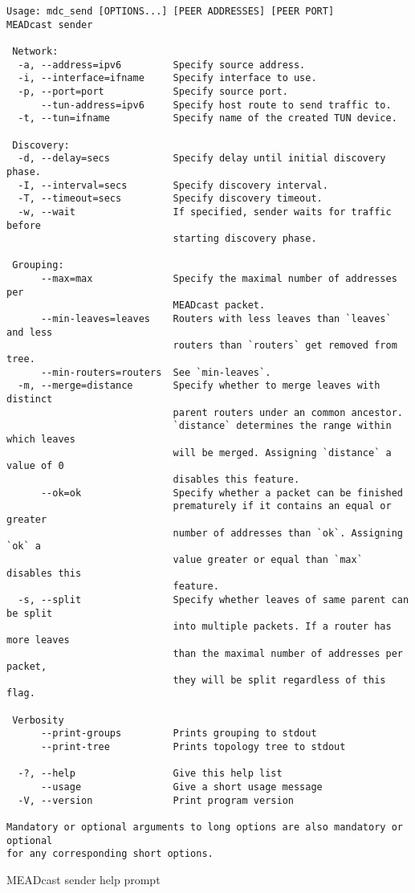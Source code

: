 \begin{listing}
\begin{verbatim}
Usage: mdc_send [OPTIONS...] [PEER ADDRESSES] [PEER PORT]
MEADcast sender

 Network:
  -a, --address=ipv6         Specify source address.
  -i, --interface=ifname     Specify interface to use.
  -p, --port=port            Specify source port.
      --tun-address=ipv6     Specify host route to send traffic to.
  -t, --tun=ifname           Specify name of the created TUN device.

 Discovery:
  -d, --delay=secs           Specify delay until initial discovery phase.
  -I, --interval=secs        Specify discovery interval.
  -T, --timeout=secs         Specify discovery timeout.
  -w, --wait                 If specified, sender waits for traffic before
                             starting discovery phase.

 Grouping:
      --max=max              Specify the maximal number of addresses per
                             MEADcast packet.
      --min-leaves=leaves    Routers with less leaves than `leaves` and less
                             routers than `routers` get removed from tree.
      --min-routers=routers  See `min-leaves`.
  -m, --merge=distance       Specify whether to merge leaves with distinct
                             parent routers under an common ancestor.
                             `distance` determines the range within which leaves
                             will be merged. Assigning `distance` a value of 0
                             disables this feature.
      --ok=ok                Specify whether a packet can be finished
                             prematurely if it contains an equal or greater
                             number of addresses than `ok`. Assigning `ok` a
                             value greater or equal than `max` disables this
                             feature.
  -s, --split                Specify whether leaves of same parent can be split
                             into multiple packets. If a router has more leaves
                             than the maximal number of addresses per packet,
                             they will be split regardless of this flag.

 Verbosity
      --print-groups         Prints grouping to stdout
      --print-tree           Prints topology tree to stdout

  -?, --help                 Give this help list
      --usage                Give a short usage message
  -V, --version              Print program version

Mandatory or optional arguments to long options are also mandatory or optional
for any corresponding short options.
\end{verbatim}
\caption{MEADcast sender help prompt}
\label{lst:send_help}
\end{listing}


